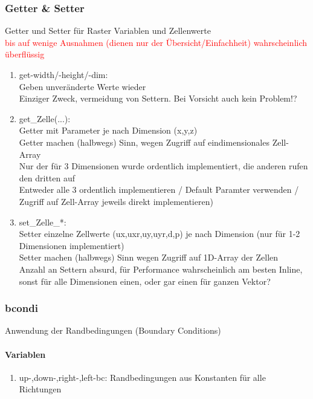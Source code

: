 \documentclass[12pt]{article}
\begin{document}
\subsubsection{Getter \& Setter}
Getter und Setter für Raster Variablen und Zellenwerte\\
\textcolor{red}{bis auf wenige Ausnahmen (dienen nur der Übersicht/Einfachheit) wahrscheinlich überflüssig}
\renewcommand{\labelenumi}{\alph{enumi})} 
\begin{enumerate}
	\item get-width/-height/-dim: \\Geben unveränderte Werte wieder\\
	Einziger Zweck, vermeidung von Settern. Bei Vorsicht auch kein Problem!?
	\item get\_Zelle(...): \\Getter mit Parameter je nach Dimension (x,y,z)\\
	Getter machen (halbwegs) Sinn, wegen Zugriff auf eindimensionales Zell-Array\\
	Nur der für 3 Dimensionen wurde ordentlich implementiert, die anderen rufen den dritten auf\\
	Entweder alle 3 ordentlich implementieren / Default Paramter verwenden / Zugriff auf Zell-Array jeweils direkt implementieren)
	\item set\_Zelle\_*: \\Setter einzelne Zellwerte (ux,uxr,uy,uyr,d,p) je nach Dimension (nur für 1-2 Dimensionen implementiert)\\
	Setter machen (halbwegs) Sinn wegen Zugriff auf 1D-Array der Zellen\\
	Anzahl an Settern absurd, für Performance wahrscheinlich am besten Inline, sonst für alle Dimensionen einen, oder gar einen für ganzen Vektor?
\end{enumerate}

\subsubsection{bcondi}
Anwendung der Randbedingungen (Boundary Conditions)

\renewcommand{\labelenumi}{\alph{enumi})} 
\paragraph{Variablen}
\begin{enumerate}
	\item up-,down-,right-,left-bc: Randbedingungen aus Konstanten für alle Richtungen
\end{enumerate}
\end{document}
